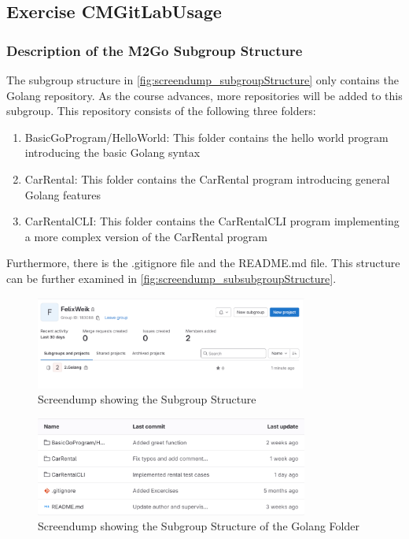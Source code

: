 \label{sec:exercise_cm_gitlab_usage}

\subsection{Exercise CMGitLabUsage}

\subsubsection*{Description of the M2Go Subgroup Structure}
The subgroup structure in \autoref{fig:screendump_subgroupStructure} only contains the Golang repository.
As the course advances, more repositories will be added to this subgroup.
This repository consists of the following three folders:
\begin{enumerate}
    \item BasicGoProgram/HelloWorld: This folder contains the hello world program introducing the basic Golang syntax
    \item CarRental: This folder contains the CarRental program introducing general Golang features
    \item CarRentalCLI: This folder contains the CarRentalCLI program implementing a more complex version of the CarRental program
\end{enumerate}
Furthermore, there is the .gitignore file and the README.md file.
This structure can be further examined in \autoref{fig:screendump_subsubgroupStructure}.

\begin{figure}[H]
    \centering
    \includegraphics[width=0.8\textwidth]{figures/goLang/golang_personalSubgroupStructure.png}
    \caption{Screendump showing the Subgroup Structure}
    \label{fig:screendump_subgroupStructure}
\end{figure}

\begin{figure}[H]
    \centering
    \includegraphics[width=0.8\textwidth]{figures/goLang/golang_personalSubsubgroupStructure.png}
    \caption{Screendump showing the Subgroup Structure of the Golang Folder}
    \label{fig:screendump_subsubgroupStructure}
\end{figure}

